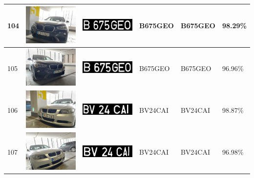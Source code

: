 \documentclass[a4paper,12pt]{report}
\begin{document}
\begin{longtable}{| m{0.6cm} | m{3cm} | m{3cm} | m{1.8cm} | m{1.8cm} | m{1.8cm} |}
    104 & \includegraphics[width=3cm,keepaspectratio]{dataset/61_d1.jpg}  & \includegraphics[width=3cm,keepaspectratio]{segmentari/104.jpg} & B675GEO             & B675GEO              & 98.29\%    \\ \hline
    105 & \includegraphics[width=3cm,keepaspectratio]{dataset/61_s1.jpg}  & \includegraphics[width=3cm,keepaspectratio]{segmentari/105.jpg} & B675GEO             & B675GEO              & 96.96\%    \\ \hline
    106 & \includegraphics[width=3cm,keepaspectratio]{dataset/62_d1.jpg}  & \includegraphics[width=3cm,keepaspectratio]{segmentari/106.jpg} & BV24CAI             & BV24CAI              & 98.87\%    \\ \hline
    107 & \includegraphics[width=3cm,keepaspectratio]{dataset/62_s1.jpg}  & \includegraphics[width=3cm,keepaspectratio]{segmentari/107.jpg} & BV24CAI             & BV24CAI              & 96.98\%    \\ \hline

\end{longtable}
\end{document}
